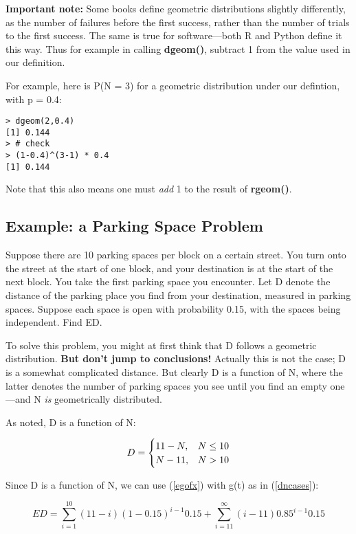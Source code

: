 {\bf Important note:}  Some books define geometric distributions
slightly differently, as the number of failures before the first
success, rather than the number of trials to the first success.  The
same is true for software---both R and Python define it this way.  Thus
for example in calling {\bf dgeom()}, subtract 1 from the value used in
our definition.

For example, here is P(N = 3) for a geometric distribution under our
defintion, with p = 0.4:

\begin{lstlisting}
> dgeom(2,0.4)
[1] 0.144
> # check
> (1-0.4)^(3-1) * 0.4
[1] 0.144
\end{lstlisting}

Note that this also means one must {\it add} 1 to the result of {\bf
rgeom()}.

\subsection{Example:  a Parking Space Problem}
\label{parking}

Suppose there are 10 parking spaces per block on a certain street.  You
turn onto the street at the start of one block, and your destination is
at the start of the next block.  You take the first parking space you
encounter.  Let D denote the distance of the parking place you find from
your destination, measured in parking spaces.  Suppose each space is
open with probability 0.15, with the spaces being independent.  Find ED.

To solve this problem, you might at first think that D follows a
geometric distribution. {\bf But don't jump to conclusions!}  Actually
this is not the case; D is a somewhat complicated distance.  But clearly
D is a function of N, where the latter denotes the number of parking
spaces you see until you find an empty one---and N {\it is}
geometrically distributed.

As noted, D is a function of N: 

\begin{equation}
\label{dncases}
D = 
\begin{cases}
11-N,  & N \leq 10 \cr
N-11,  & N  > 10 \cr
\end{cases}
\end{equation}

Since D is a function of N, we can use (\ref{egofx}) with g(t) as in
(\ref{dncases}):

\begin{equation}
\label{expectdist}
ED = \sum_{i=1}^{10} (11-i) (1-0.15)^{i-1} 0.15 +
\sum_{i=11}^{\infty} (i-11) 0.85^{i-1} 0.15 
\end{equation}

